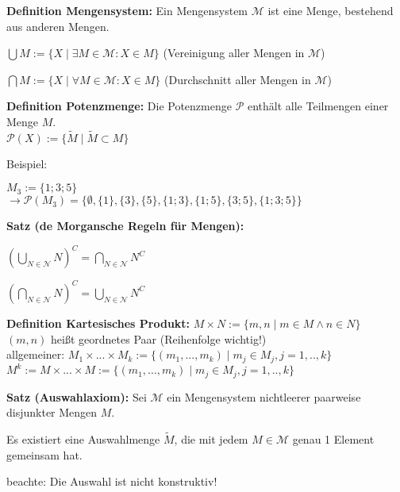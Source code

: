 \begin{framed}
	\textbf{Definition Mengensystem:} Ein Mengensystem $\mathcal M$ ist eine Menge, bestehend aus 				anderen Mengen.
	\begin{compactitem}
		\item $\bigcup M := \{X \mid \exists M \in \mathcal M: X \in M\}$ (Vereinigung aller Mengen in 
		$\mathcal M$)
		\item $\bigcap M := \{X \mid \forall M \in \mathcal M: X \in M\}$ (Durchschnitt aller Mengen in 
		$\mathcal M$)
	\end{compactitem}
\end{framed}

\begin{framed}
	\textbf{Definition Potenzmenge:} Die Potenzmenge $\mathcal P$ enth\"alt alle Teilmengen einer 				Menge $M$. \\
	$\mathcal P(X) := \{\tilde M \mid \tilde M \subset M\}$ 
\end{framed}

Beispiel:
\begin{compactitem}
	\item $M_3 := \{1;3;5\}$ \\
	$\to \mathcal P(M_3) = \{\emptyset, \{1\}, \{3\}, \{5\}, \{1;3\}, \{1;5\}, \{3;5\}, \{1;3;5\}\}$
\end{compactitem}

\begin{framed}
	\textbf{Satz (de Morgansche Regeln f\"ur Mengen):}
	\begin{compactitem}
		\item $(\mathop{\bigcup}_{N \in \mathcal N} N)^C = \mathop{\bigcap}_{N \in \mathcal N} N^C$ 
		\item $(\mathop{\bigcap}_{N \in \mathcal N} N)^C = \mathop{\bigcup}_{N \in \mathcal N} N^C$ 
	\end{compactitem}
\end{framed}

\begin{framed}
	\textbf{Definition Kartesisches Produkt:} 
	$M \times N := \{m,n \mid m \in M \land n \in N\}$ \\
	$(m,n)$ hei{\ss}t geordnetes Paar (Reihenfolge wichtig!) \\
	allgemeiner: $M_1 \times ... \times M_k := \{(m_1,...,m_k) \mid m_j \in M_j, j=1, .., k\}$ \\
	$M^k := M \times ... \times M := \{(m_1,...,m_k) \mid m_j \in M_j, j=1, .., k\}$ 
\end{framed}

\begin{framed}
	\textbf{Satz (Auswahlaxiom): } Sei $\mathcal M$ ein Mengensystem nichtleerer paarweise disjunkter Mengen $M$.
	\begin{compactitem}
		\item Es existiert eine Auswahlmenge $\tilde M$, die mit jedem $M \in \mathcal M$ genau 1 Element 				gemeinsam hat.
		\item beachte: Die Auswahl ist nicht konstruktiv!
	\end{compactitem}
\end{framed}